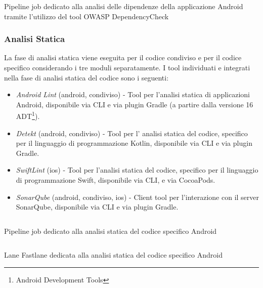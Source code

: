 \begin{listing}[H]
\inputminted{yaml}{code/4-depcheckjob}
\caption{Pipeline job dedicato alla analisi delle dipendenze della applicazione Android tramite l'utilizzo del tool OWASP DependencyCheck}
\end{listing}

\subsubsection{Analisi Statica}
La fase di analisi statica viene eseguita per il codice condiviso e per il codice specifico considerando i tre moduli separatamente. I tool individuati e integrati nella fase di analisi statica del codice sono i seguenti:
\begin{itemize}
    \item \textit{Android Lint} (android, condiviso) - Tool per l'analisi statica di applicazioni Android, disponibile via CLI e via plugin Gradle (a partire dalla versione 16 ADT\footnote{Android Development Tools}).
    \item \textit{Detekt} (android, condiviso) - Tool per l' analisi statica del codice, specifico per il linguaggio di programmazione Kotlin, disponibile via CLI e via plugin Gradle.
    \item \textit{SwiftLint} (ios) - Tool per l'analisi statica del codice, specifico per il linguaggio di programmazione Swift, disponibile via CLI, e via CocoaPods.
    \item \textit{SonarQube} (android, condiviso, ios) - Client tool per l'interazione con il server SonarQube, disponibile via CLI e via plugin Gradle.
\end{itemize}

\begin{listing}[H]
\inputminted{yaml}{code/4-sastjob}
\caption{Pipeline job dedicato alla analisi statica del codice specifico Android}
\end{listing}

\begin{listing}[H]
\inputminted{ruby}{code/4-sastfastlane}
\caption{Lane Fastlane dedicata alla analisi statica del codice specifico Android}
\end{listing}

